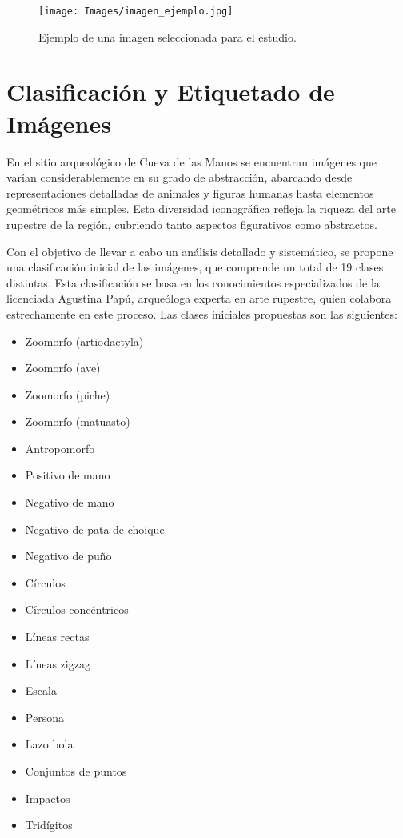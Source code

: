 \begin{figure}[ht!]
    \centering
    \texttt{[image: Images/imagen\_ejemplo.jpg]}
    \caption{Ejemplo de una imagen seleccionada para el estudio.}
    \label{fig:imagen_ejemplo}
\end{figure}

\section{Clasificación y Etiquetado de Imágenes}

En el sitio arqueológico de Cueva de las Manos se encuentran imágenes que varían considerablemente en su grado de abstracción, abarcando desde representaciones detalladas de animales y figuras humanas hasta elementos geométricos más simples. Esta diversidad iconográfica refleja la riqueza del arte rupestre de la región, cubriendo tanto aspectos figurativos como abstractos.

Con el objetivo de llevar a cabo un análisis detallado y sistemático, se propone una clasificación inicial de las imágenes, que comprende un total de 19 clases distintas. Esta clasificación se basa en los conocimientos especializados de la licenciada Agustina Papú, arqueóloga experta en arte rupestre, quien colabora estrechamente en este proceso. Las clases iniciales propuestas son las siguientes:

\begin{itemize}
    \item Zoomorfo (artiodactyla)
    \item Zoomorfo (ave)
    \item Zoomorfo (piche)
    \item Zoomorfo (matuasto)
    \item Antropomorfo
    \item Positivo de mano
    \item Negativo de mano
    \item Negativo de pata de choique
    \item Negativo de puño
    \item Círculos
    \item Círculos concéntricos
    \item Líneas rectas
    \item Líneas zigzag
    \item Escala
    \item Persona
    \item Lazo bola
    \item Conjuntos de puntos
    \item Impactos
    \item Tridígitos
\end{itemize}

